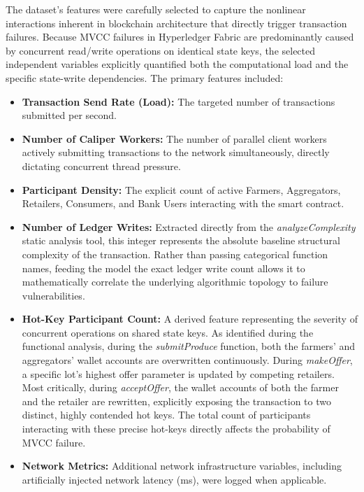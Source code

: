 \documentclass[manuscript,screen,nofonts]{acmart}
\begin{document}
The dataset's features were carefully selected to capture the nonlinear interactions inherent in blockchain architecture that directly trigger transaction failures. Because MVCC failures in Hyperledger Fabric are predominantly caused by concurrent read/write operations on identical state keys, the selected independent variables explicitly quantified both the computational load and the specific state-write dependencies. The primary features included:
\begin{itemize}
    \item \textbf{Transaction Send Rate (Load):} The targeted number of transactions submitted per second.
    \item \textbf{Number of Caliper Workers:} The number of parallel client workers actively submitting transactions to the network simultaneously, directly dictating concurrent thread pressure.
    \item \textbf{Participant Density:} The explicit count of active Farmers, Aggregators, Retailers, Consumers, and Bank Users interacting with the smart contract.
    \item \textbf{Number of Ledger Writes:} Extracted directly from the \textit{analyzeComplexity} static analysis tool, this integer represents the absolute baseline structural complexity of the transaction. Rather than passing categorical function names, feeding the model the exact ledger write count allows it to mathematically correlate the underlying algorithmic topology to failure vulnerabilities.
    \item \textbf{Hot-Key Participant Count:} A derived feature representing the severity of concurrent operations on shared state keys. As identified during the functional analysis, during the \textit{submitProduce} function, both the farmers' and aggregators' wallet accounts are overwritten continuously. During \textit{makeOffer}, a specific lot's highest offer parameter is updated by competing retailers. Most critically, during \textit{acceptOffer}, the wallet accounts of both the farmer and the retailer are rewritten, explicitly exposing the transaction to two distinct, highly contended hot keys. The total count of participants interacting with these precise hot-keys directly affects the probability of MVCC failure.
    \item \textbf{Network Metrics:} Additional network infrastructure variables, including artificially injected network latency (ms), were logged when applicable.
\end{itemize}
\end{document}
